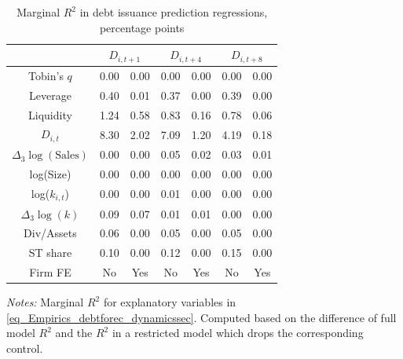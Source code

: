 \begin{table}[ht]
\centering
\caption{Marginal $R^{2}$ in debt issuance prediction regressions, percentage points} 
\label{tab:mr2_data}
\begin{tabular}{ccccccc}
  \hline \hline 
 & \multicolumn{2}{c}{$D_{i,t+1}$} & \multicolumn{2}{c}{$D_{i,t+4}$} & \multicolumn{2}{c}{$D_{i,t+8}$} \\ 
 \hline
  \hline
Tobin's $q$ & 0.00 & 0.00 & 0.00 & 0.00 & 0.00 & 0.00 \\ 
  Leverage & 0.40 & 0.01 & 0.37 & 0.00 & 0.39 & 0.00 \\ 
  Liquidity & 1.24 & 0.58 & 0.83 & 0.16 & 0.78 & 0.06 \\ 
  $D_{i,t}$ & 8.30 & 2.02 & 7.09 & 1.20 & 4.19 & 0.18 \\ 
  $\Delta_{3} \log(\text{Sales})$ & 0.00 & 0.00 & 0.05 & 0.02 & 0.03 & 0.01 \\ 
  log(Size) & 0.00 & 0.00 & 0.00 & 0.00 & 0.00 & 0.00 \\ 
  log($k_{i,t}$) & 0.00 & 0.00 & 0.01 & 0.00 & 0.00 & 0.00 \\ 
  $\Delta_{3} \log(k)$ & 0.09 & 0.07 & 0.01 & 0.01 & 0.00 & 0.00 \\ 
  Div/Assets & 0.06 & 0.00 & 0.05 & 0.00 & 0.05 & 0.00 \\ 
  ST share & 0.10 & 0.00 & 0.12 & 0.00 & 0.15 & 0.00 \\ 
   \hline Firm FE & \multicolumn{1}{c}{No} & \multicolumn{1}{c}{Yes} & \multicolumn{1}{c}{No} & \multicolumn{1}{c}{Yes} & \multicolumn{1}{c}{No} & \multicolumn{1}{c}{Yes} \\ 
\hline 
 \hline
\end{tabular}

\vspace{4pt}
\begin{minipage}{\textwidth}
{\footnotesize \emph{Notes:} Marginal $R^{2}$ for explanatory variables in \eqref{eq_Empirics_debtforec_dynamicssec}.
Computed based on the difference of full model $R^{2}$ and the $R^{2}$ in a restricted model which drops the corresponding control.
}
\end{minipage}

\end{table}

